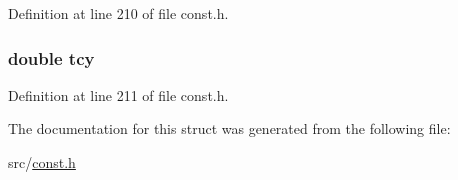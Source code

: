 Definition at line 210 of file const.\+h.

\hypertarget{structdtriangle_ad7e4839fedb247de52c88116356dd33e}{}
\subsubsection[{tcy}]{\setlength{\rightskip}{0pt plus 5cm}double tcy}\label{structdtriangle_ad7e4839fedb247de52c88116356dd33e}


Definition at line 211 of file const.\+h.



The documentation for this struct was generated from the following file\+:\begin{DoxyCompactItemize}
\item 
src/\hyperlink{const_8h}{const.\+h}\end{DoxyCompactItemize}
